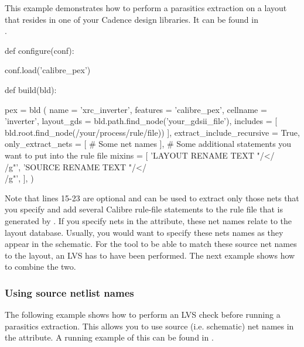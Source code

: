 This example demonstrates how to perform a parasitics extraction on a layout
that resides in one of your Cadence design libraries. It can be found in\\
.

\begin{lstwscript}
def configure(conf):

    conf.load('calibre_pex')

def build(bld):

    pex = bld (
        name = 'xrc_inverter',
        features = 'calibre_pex',
        cellname = 'inverter',
        layout_gds = bld.path.find_node('your_gdsii_file'),
        includes = [
            bld.root.find_node(/your/process/rule/file))
        ],
        extract_include_recursive = True,
        only_extract_nets = [
            # Some net names
        ],
        # Some additional statements you want to put into the rule file
        mixins = [
            'LAYOUT RENAME TEXT "/</\\[/g" "/>/\\]/g"',
            'SOURCE RENAME TEXT "/</\\[/g" "/>/\\]/g"',
        ],
    )
\end{lstwscript}

Note that lines 15-23 are optional and can be used to extract only those nets
that you specify and add several Calibre rule-file statements to the rule file
that is generated by .
If you specify nets in the  attribute, these net names
relate to the layout database. Usually, you would want to specify these nets
names as they appear in the schematic. For the tool to be able to match these
source net names to the layout, an LVS has to have been performed. The next
example shows how to combine the two.

\subsubsection{Using source netlist names}
The following example shows how to perform an \gls{LVS} check before running a
parasitics extraction. This allows you to use source (i.e. schematic) net names
in the  attribute.
A running example of this can be found in
.

